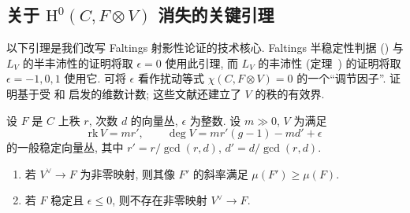 \subsection{\texorpdfstring{关于 $\mathrm H^0(C,F\otimes V)$ 消失的关键引理}{关于零次上同调消失的关键引理}}\label{src:9.6.1-subsection}
以下引理是我们改写 Faltings 射影性论证的技术核心. Faltings 半稳定性判据 () 与 $L_V$ 的半丰沛性的证明将取 $\epsilon=0$ 使用此引理, 而 $L_V$ 的丰沛性 (定理~) 的证明将取 $\epsilon=-1,0,1$ 使用它. 可将 $\epsilon$ 看作扰动等式 $\chi(C,F\otimes V)=0$ 的一个``调节因子''. 证明基于受 \cite{EP04} 和 \cite[\S5]{Lan83b} 启发的维数计数; 这些文献还建立了 $V$ 的秩的有效界.
\begin{lemma}\label{src:9.6.1}
设 $F$ 是 $C$ 上秩 $r$, 次数 $d$ 的向量丛, $\epsilon$ 为整数. 设 $m\gg0$, $V$ 为满足
\[
\mathrm{rk}\,V=mr',\qquad\deg V=mr'(g-1)-md'+\epsilon
\]
的一般稳定向量丛, 其中 $r'=r/\gcd(r,d)$, $d'=d/\gcd(r,d)$.
\begin{enumerate}[(1)]
\item 若 $V^\vee\to F$ 为非零映射, 则其像 $F'$ 的斜率满足 $\mu(F')\geq\mu(F)$.
\item 若 $F$ 稳定且 $\epsilon\leq0$, 则不存在非零映射 $V^\vee\to F$.
\end{enumerate}
\end{lemma}

